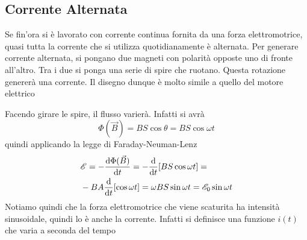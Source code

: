 \subsection{Corrente Alternata}
Se fin'ora si è lavorato con corrente continua fornita da una forza elettromotrice, quasi tutta
la corrente che si utilizza quotidianamente è alternata. Per generare corrente alternata, si
pongano due magneti con polarità opposte uno di fronte all'altro. Tra i due si ponga una serie
di spire che ruotano. Questa rotazione genererà una corrente. Il disegno dunque è molto simile
a quello del motore elettrico
\begin{center}
\end{center}
Facendo girare le spire, il flusso varierà. Infatti si avrà
\begin{equation*}
  \Phi(\vec{B})=BS\cos\theta = BS\cos\omega t
\end{equation*}
quindi applicando la legge di Faraday-Neuman-Lenz
\begin{align*}
  &\mathcal{E} = -\frac{\mathop{}\!\mathrm{d}\Phi(\vec{B})}{\mathop{}\!\mathrm{d} t} = -\frac{\mathop{}\!\mathrm{d}}{\mathop{}\!\mathrm{d} t}[BS\cos\omega t] =\\
  &-BA \frac{\mathop{}\!\mathrm{d}}{\mathop{}\!\mathrm{d} t}[\cos\omega t]=\omega BS\sin\omega t= \mathcal{E}_0\sin\omega t 
\end{align*}
Notiamo quindi che la forza elettromotrice che viene scaturita ha intensità sinusoidale, quindi
lo è anche la corrente. Infatti si definisce una funzione $i(t)$ che varia a seconda del tempo

